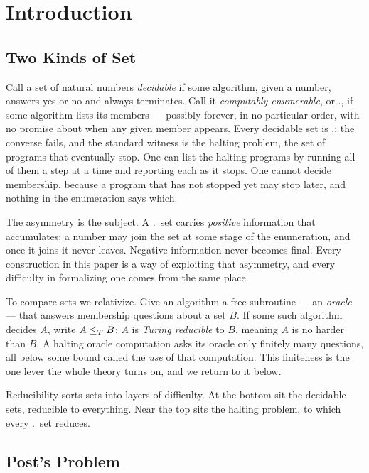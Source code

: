 \section{Introduction}
\label{sec:intro}

\subsection{Two Kinds of Set}

Call a set of natural numbers \emph{decidable} if some algorithm, given a
number, answers yes or no and always terminates.  Call it \emph{computably
enumerable}, or \ce., if some algorithm lists its members --- possibly
forever, in no particular order, with no promise about when any given
member appears.  Every decidable set is \ce.; the converse fails, and the
standard witness is the halting problem, the set of programs that
eventually stop.  One can list the halting programs by running all of them
a step at a time and reporting each as it stops.  One cannot decide
membership, because a program that has not stopped yet may stop later, and
nothing in the enumeration says which.

The asymmetry is the subject.  A \ce.\ set carries \emph{positive}
information that accumulates: a number may join the set at some stage of
the enumeration, and once it joins it never leaves.  Negative information
never becomes final.  Every construction in this paper is a way of
exploiting that asymmetry, and every difficulty in formalizing one comes
from the same place.

To compare sets we relativize.  Give an algorithm a free subroutine --- an
\emph{oracle} --- that answers membership questions about a set $B$.  If
some such algorithm decides $A$, write $A \leq_T B$: $A$ is \emph{Turing
reducible} to $B$, meaning $A$ is no harder than $B$.  A halting oracle
computation asks its oracle only finitely many questions, all below some
bound called the \emph{use} of that computation.  This finiteness is the
one lever the whole theory turns on, and we return to it below.

Reducibility sorts sets into layers of difficulty.  At the bottom sit the
decidable sets, reducible to everything.  Near the top sits the halting
problem, to which every \ce.\ set reduces.

\subsection{Post's Problem}

